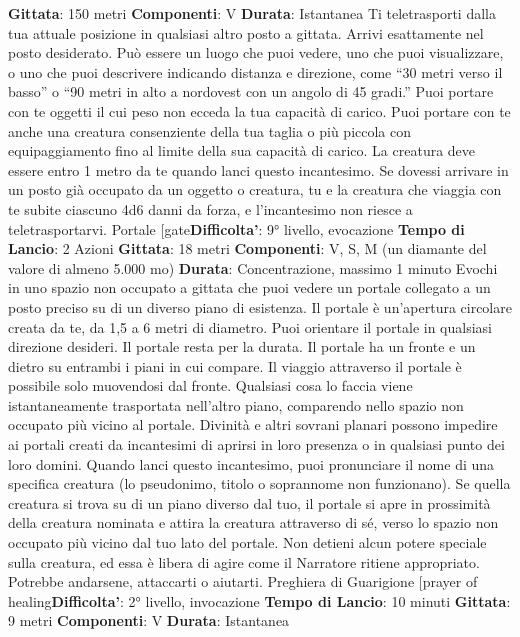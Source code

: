\begin{multicols}{2}
\textbf{Gittata}: 150 metri
\textbf{Componenti}: V
\textbf{Durata}: Istantanea
Ti teletrasporti dalla tua attuale posizione in qualsiasi
altro posto a gittata. Arrivi esattamente nel posto
desiderato. Può essere un luogo che puoi vedere, uno
che puoi visualizzare, o uno che puoi descrivere
indicando distanza e direzione, come “30 metri verso il
basso” o “90 metri in alto a nordovest con un angolo di
45 gradi.”
Puoi portare con te oggetti il cui peso non ecceda la tua
capacità di carico. Puoi portare con te anche una
creatura consenziente della tua taglia o più piccola con
equipaggiamento fino al limite della sua capacità di
carico. La creatura deve essere entro 1 metro da te
quando lanci questo incantesimo.
Se dovessi arrivare in un posto già occupato da un
oggetto o creatura, tu e la creatura che viaggia con te
subite ciascuno 4d6 danni da forza, e l’incantesimo non
riesce a teletrasportarvi.
Portale
[gate\textbf{Difficolta'}:
9° livello, evocazione
\textbf{Tempo di Lancio}: 2 Azioni
\textbf{Gittata}: 18 metri
\textbf{Componenti}: V, S, M (un diamante del valore di
almeno 5.000 mo)
\textbf{Durata}: Concentrazione, massimo 1 minuto
Evochi in uno spazio non occupato a gittata che puoi
vedere un portale collegato a un posto preciso su di un
diverso piano di esistenza. Il portale è un’apertura
circolare creata da te, da 1,5 a 6 metri di diametro. Puoi
orientare il portale in qualsiasi direzione desideri. Il
portale resta per la durata.
Il portale ha un fronte e un dietro su entrambi i piani in
cui compare. Il viaggio attraverso il portale è possibile
solo muovendosi dal fronte. Qualsiasi cosa lo faccia
viene istantaneamente trasportata nell’altro piano,
comparendo nello spazio non occupato più vicino al
portale.
Divinità e altri sovrani planari possono impedire ai
portali creati da incantesimi di aprirsi in loro presenza o
in qualsiasi punto dei loro domini.
Quando lanci questo incantesimo, puoi pronunciare il
nome di una specifica creatura (lo pseudonimo, titolo o
soprannome non funzionano). Se quella creatura si
trova su di un piano diverso dal tuo, il portale si apre in
prossimità della creatura nominata e attira la creatura
attraverso di sé, verso lo spazio non occupato più vicino
dal tuo lato del portale. Non detieni alcun potere
speciale sulla creatura, ed essa è libera di agire come il
Narratore ritiene appropriato. Potrebbe andarsene, attaccarti
o aiutarti.
Preghiera di Guarigione
[prayer of healing\textbf{Difficolta'}:
2° livello, invocazione
\textbf{Tempo di Lancio}: 10 minuti
\textbf{Gittata}: 9 metri
\textbf{Componenti}: V
\textbf{Durata}: Istantanea

\end{multicols}
